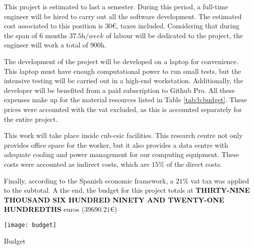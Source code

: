 \documentclass[../main.tex]{subfiles}
\begin{document}
This project is estimated to last a semester. During this period, a full-time engineer will be hired to carry out all the software development. The estimated cost associated to this position is $30 \si{\euro}$, taxes included. Considering that during the span of 6 months $37.5 \si{\hour/week}$ of labour will be dedicated to the project, the engineer will work a total of $900 \si{\hour}$.

The development of the project will be developed on a laptop for convenience. This laptop must have enough computational power to run small tests, but the intensive testing will be carried out in a high-end workstation. Additionally, the developer will be benefited from a paid subscription to Github Pro. All these expenses make up for the material resources listed in Table \ref{tab:b:budget}. These prices were accounted with the \gls{vat} excluded, as this is accounted separately for the entire project.

This work will take place inside \gls{cnb}-\gls{csic} facilities. This research centre not only provides office space for the worker, but it also provides a data centre with adequate cooling and power management for our computing equipment. These costs were accounted as indirect costs, which are $15 \si{\percent}$ of the direct costs. 

Finally, according to the Spanish economic framework, a $21 \si{\percent}$ \gls{vat} tax was applied to the subtotal. A the end, the budget for this project totals at \textbf{THIRTY-NINE THOUSAND SIX HUNDRED NINETY AND TWENTY-ONE HUNDREDTHS} euros ($39690.21 \si{\euro}$)

\begin{table}[hbpt]
    \centering
    \texttt{[image: budget]}
    \caption{Budget}
    \label{tab:b:budget}
\end{table}
\end{document}
